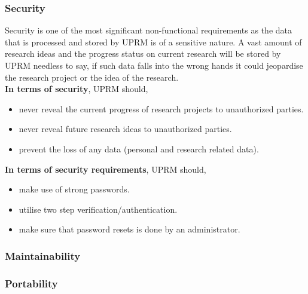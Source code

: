 \subsubsection{Security}
Security is one of the most significant non-functional requirements as the data that is processed and stored by UPRM is of a sensitive nature. 
A vast amount of research ideas and the progress status on current research will be stored by UPRM needless to say, if such data falls into the wrong hands it could jeopardise the research project or the idea of the research.\\ 

\textbf{In terms of security}, UPRM should,
	\begin{itemize} 
		\item never reveal the current progress of research projects to unauthorized parties.
		\item never reveal future research ideas to unauthorized parties.
		\item prevent the loss of any data (personal and research related data).
	\end{itemize}

\textbf{In terms of security requirements}, UPRM should,
	\begin{itemize} 
		\item make use of strong passwords.
		\item utilise two step verification/authentication.
		\item make sure that password resets is done by an administrator.
	\end{itemize}

\subsubsection{Maintainability}

\subsubsection{Portability}